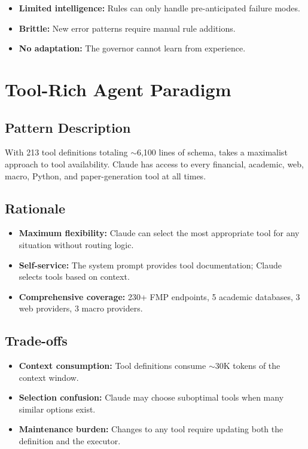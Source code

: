 \begin{itemize}
  \item \textbf{Limited intelligence:} Rules can only handle pre-anticipated failure modes.
  \item \textbf{Brittle:} New error patterns require manual rule additions.
  \item \textbf{No adaptation:} The governor cannot learn from experience.
\end{itemize}

\section{Tool-Rich Agent Paradigm}
\label{sec:patterns:tool-rich}

\subsection{Pattern Description}

With 213 tool definitions totaling $\sim$6,100 lines of schema, \autoscholar takes a maximalist approach to tool availability.
Claude has access to every financial, academic, web, macro, Python, and paper-generation tool at all times.

\subsection{Rationale}

\begin{itemize}
  \item \textbf{Maximum flexibility:} Claude can select the most appropriate tool for any situation without routing logic.
  \item \textbf{Self-service:} The system prompt provides tool documentation; Claude selects tools based on context.
  \item \textbf{Comprehensive coverage:} 230+ FMP endpoints, 5 academic databases, 3 web providers, 3 macro providers.
\end{itemize}

\subsection{Trade-offs}

\begin{itemize}
  \item \textbf{Context consumption:} Tool definitions consume $\sim$30K tokens of the context window.
  \item \textbf{Selection confusion:} Claude may choose suboptimal tools when many similar options exist.
  \item \textbf{Maintenance burden:} Changes to any tool require updating both the definition and the executor.
\end{itemize}


